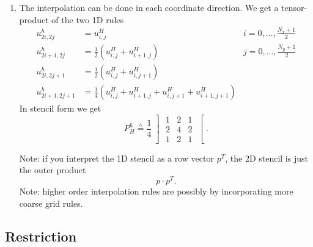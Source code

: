 \begin{enumerate}[label=\Alph{enumi})]
\begin{enumerate}[label=\underline{\arabic{enumi}D}]
	\item The interpolation can be done in each coordinate direction.
		We get a tensor-product of the two 1D rules
		\begin{align*}
			u_{2i, 2j}^{h} &= u_{i,j}^{H} &i=0, \ldots, \frac{N_{x}+1}{2} \\
			u_{2i+1, 2j}^{h} &= \frac{1}{2}(u_{i,j}^{H}+u_{i+1,j}^{H}) &j=0, \ldots, \frac{N_{y}+1}{2} \\
			u_{2i,2j+1}^{h} &= \frac{1}{2}(u_{i,j}^{H}+u_{i,j+1}^{H}) \\
			u_{2i+1, 2j+1}^{h} &= \frac{1}{4}(u_{i,j}^{H}+ u_{i+1,j}^{H}+ u_{i,j+1}^{H}+ u_{i+1,j+1}^{H})
		\end{align*}
		In stencil form we get
		\[
			P_{H}^{h} \overset{\wedge}{=} \frac{1}{4}
			\left]
			\begin{matrix}
				1 & 2 & 1 \\
				2 & 4 & 2 \\
				1 & 2 & 1 
			\end{matrix}
			\right[
		.\] 
		
		Note: if you interpret the 1D stencil as a row vector $p^{T}$, the 2D stencil is just the outer product 
		\[
		p\cdot p^{T}
		.\] 
		Note: higher order interpolation rules are possibly by incorporating more coarse grid rules.
		\end{enumerate}
\end{enumerate}

\subsection{Restriction}%
\label{sec:Restriction}

